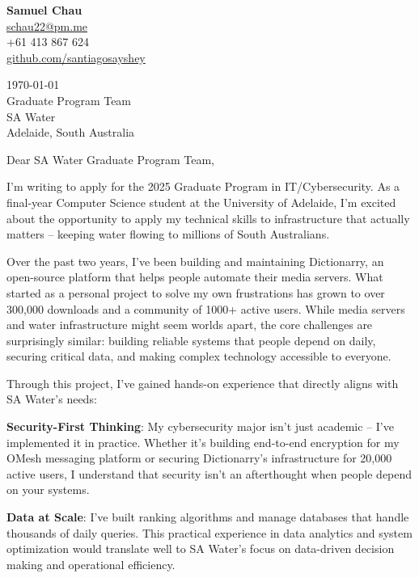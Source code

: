 \documentclass[11pt,a4paper]{article}
\begin{document}
\noindent
\begin{minipage}[t]{0.5\textwidth}
    \textbf{Samuel Chau}\\
    \href{mailto:schau22@pm.me}{schau22@pm.me}\\
    +61 413 867 624\\
    \href{https://github.com/santiagosayshey}{github.com/santiagosayshey}
\end{minipage}
\hfill
\begin{minipage}[t]{0.45\textwidth}
    \raggedleft
    \today\\[10pt]
    Graduate Program Team\\
    SA Water\\
    Adelaide, South Australia
\end{minipage}

\vspace{20pt}

\noindent Dear SA Water Graduate Program Team,

I'm writing to apply for the 2025 Graduate Program in IT/Cybersecurity. As a final-year Computer Science student at the University of Adelaide, I'm excited about the opportunity to apply my technical skills to infrastructure that actually matters – keeping water flowing to millions of South Australians.

Over the past two years, I've been building and maintaining Dictionarry, an open-source platform that helps people automate their media servers. What started as a personal project to solve my own frustrations has grown to over 300,000 downloads and a community of 1000+ active users. While media servers and water infrastructure might seem worlds apart, the core challenges are surprisingly similar: building reliable systems that people depend on daily, securing critical data, and making complex technology accessible to everyone.

Through this project, I've gained hands-on experience that directly aligns with SA Water's needs:

\textbf{Security-First Thinking}: My cybersecurity major isn't just academic – I've implemented it in practice. Whether it's building end-to-end encryption for my OMesh messaging platform or securing Dictionarry's infrastructure for 20,000 active users, I understand that security isn't an afterthought when people depend on your systems.

\textbf{Data at Scale}: I've built ranking algorithms and manage databases that handle thousands of daily queries. This practical experience in data analytics and system optimization would translate well to SA Water's focus on data-driven decision making and operational efficiency.
\end{document}
